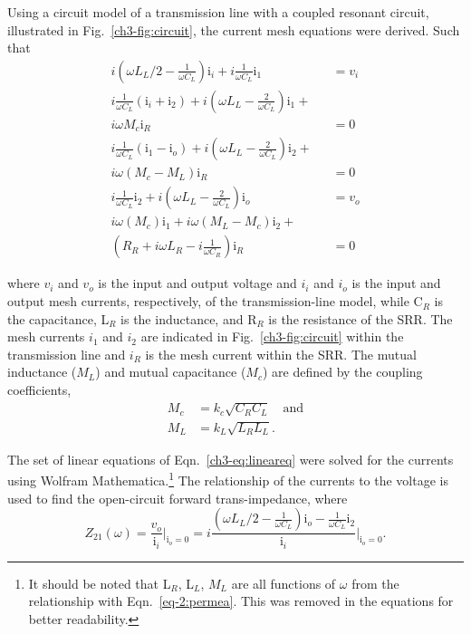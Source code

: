 Using a circuit model of a transmission line with a coupled resonant circuit, illustrated in Fig.~\ref{ch3-fig:circuit}, the current mesh equations were derived. Such that
\begin{subequations}
\begin{eqnarray}
i(\omega L_L/2 - \frac{1}{\omega C_L}) \text{i}_i +  i\frac{1}{\omega C_L} \text{i}_1 &= v_i  \\
i\frac{1}{\omega C_L} (\text{i}_{i}+\text{i}_2) + i(\omega L_L - \frac{2}{\omega C_L}) \text{i}_{1} + \nonumber \\
 i \omega M_c \text{i}_R &= 0  \\
i\frac{1}{\omega C_L} (\text{i}_{1}-\text{i}_{o}) + i(\omega L_L - \frac{2}{\omega C_L}) \text{i}_{2} + \nonumber \\
i \omega (M_c - M_L) \text{i}_R &= 0  \\
i \frac{1}{\omega C_L} \text{i}_{2} + i(\omega L_L - \frac{2}{\omega C_L}) \text{i}_{o}  &= v_o  \\
i \omega (M_c) \text{i}_{1} + i \omega (M_L - M_c)\text{i}_2 + \qquad \nonumber \\ 
(R_R + i \omega L_R - i\frac{1}{\omega C_R}) \text{i}_R  &= 0
\end{eqnarray}\label{ch3-eq:lineareq}
\end{subequations}

\noindent 
where $v_i$ and $v_o$ is the input and output voltage and $i_i$ and $i_o$ is the input and output mesh currents, respectively, of the transmission-line model, while C$_R$ is the capacitance, L$_R$ is the inductance, and R$_R$ is the resistance of the SRR. The mesh currents $i_1$ and $i_2$ are indicated in Fig.~\ref{ch3-fig:circuit} within the transmission line and $i_R$ is the mesh current within the SRR. The mutual inductance ($M_L$) and mutual capacitance ($M_c$) are defined by the coupling coefficients, 
\begin{subequations}
\begin{eqnarray}
    M_c &= k_c \sqrt{C_R C_L}\quad \text{and} \\
    M_L &= k_L \sqrt{L_R L_L}.
\end{eqnarray}
\end{subequations}

The set of linear equations of Eqn.~\ref{ch3-eq:lineareq} were solved for the currents using Wolfram Mathematica.\footnote{It should be noted that L$_R$, L$_L$, $M_L$ are all functions of $\omega$ from the relationship with Eqn.~\ref{eq-2:permea}. This was removed in the equations for better readability.} The relationship of the currents to the voltage is used to find the open-circuit forward trans-impedance, where
\begin{equation}
    Z_{21}(\omega) = \frac{v_o}{\text{i}_i} \Biggr\rvert_{\text{i}_o=0} =i \frac{(\omega L_L/2 - \frac{1}{\omega C_L}) \text{i}_o - \frac{1}{\omega C_L} \text{i}_2  }{\text{i}_i} \Biggr\rvert_{\text{i}_o=0}.
\end{equation}

